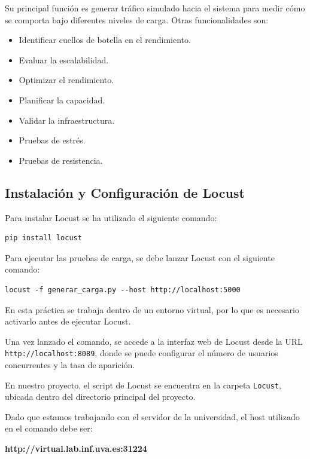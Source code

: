 \documentclass[10pt]{book}
\begin{document}
    Su principal función es generar tráfico simulado hacia el sistema para medir cómo se comporta bajo diferentes niveles de carga. Otras funcionalidades son:
        \begin{itemize}
            \item Identificar cuellos de botella en el rendimiento.
            \item Evaluar la escalabilidad.
            \item Optimizar el rendimiento.
            \item Planificar la capacidad.
            \item Validar la infraestructura.
            \item Pruebas de estrés.
            \item Pruebas de resistencia.
        \end{itemize}


\subsection{Instalación y Configuración de Locust} 

\cite{locust_video}Para instalar Locust se ha utilizado el siguiente comando:

\begin{lstlisting}[style=simplebash]
pip install locust
\end{lstlisting}

Para ejecutar las pruebas de carga, se debe lanzar Locust con el siguiente comando:

\begin{lstlisting}[style=simplebash]
locust -f generar_carga.py --host http://localhost:5000
\end{lstlisting}

En esta práctica se trabaja dentro de un entorno virtual, por lo que es necesario activarlo antes de ejecutar Locust.

Una vez lanzado el comando, se accede a la interfaz web de Locust desde la URL \texttt{http://localhost:8089}, donde se puede configurar el número de usuarios concurrentes y la tasa de aparición.

En nuestro proyecto, el script de Locust se encuentra en la carpeta \texttt{Locust}, ubicada dentro del directorio principal del proyecto. 

Dado que estamos trabajando con el servidor de la universidad, el host utilizado en el comando debe ser:

\begin{center}
\textbf{http://virtual.lab.inf.uva.es:31224}
\end{center}
\end{document}
